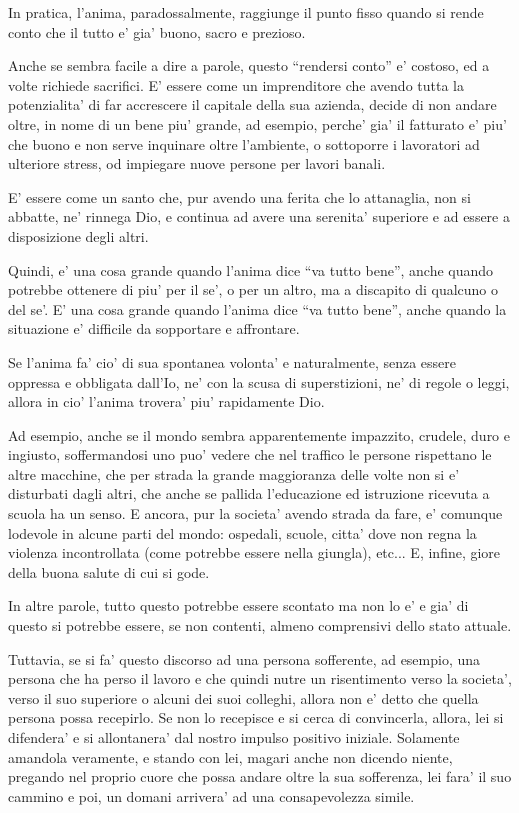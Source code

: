 In pratica, l'anima, paradossalmente, raggiunge il punto fisso quando si rende conto che il tutto e' gia' buono, sacro e prezioso.

Anche se sembra facile a dire a parole, questo ``rendersi conto'' e' costoso, ed a volte richiede sacrifici. E' essere come un imprenditore che avendo tutta la potenzialita' di far accrescere il capitale della sua azienda, decide di non andare oltre, in nome di un bene piu' grande, ad esempio, perche' gia' il fatturato e' piu' che buono e non serve inquinare oltre l'ambiente, o sottoporre i lavoratori ad ulteriore stress, od impiegare nuove persone per lavori banali.

E' essere come un santo che, pur avendo una ferita che lo attanaglia, non si abbatte, ne' rinnega Dio, e continua ad avere una serenita' superiore e ad essere a disposizione degli altri.

Quindi, e' una cosa grande quando l'anima dice ``va tutto bene'', anche quando potrebbe ottenere di piu' per il se', o per un altro, ma a discapito di qualcuno o del se'. E' una cosa grande quando l'anima dice ``va tutto bene'', anche quando la situazione e' difficile da sopportare e affrontare.

Se l'anima fa' cio' di sua spontanea volonta' e naturalmente, senza essere oppressa e obbligata dall'Io, ne' con la scusa di superstizioni, ne' di regole o leggi, allora in cio' l'anima trovera' piu' rapidamente Dio.

Ad esempio, anche se il mondo sembra apparentemente impazzito, crudele, duro e ingiusto, soffermandosi uno puo' vedere che nel traffico le persone rispettano le altre macchine, che per strada la grande maggioranza delle volte non si e' disturbati dagli altri, che anche se pallida l'educazione ed istruzione ricevuta a scuola ha un senso. E ancora, pur la societa' avendo strada da fare, e' comunque lodevole in alcune parti del mondo: ospedali, scuole, citta' dove non regna la violenza incontrollata (come potrebbe essere nella giungla), etc... E, infine, giore della buona salute di cui si gode.

In altre parole, tutto questo potrebbe essere scontato ma non lo e' e gia' di questo si potrebbe essere, se non contenti, almeno comprensivi dello stato attuale.

Tuttavia, se si fa' questo discorso ad una persona sofferente, ad esempio, una persona che ha perso il lavoro e che quindi nutre un risentimento verso la societa', verso il suo superiore o alcuni dei suoi colleghi, allora non e' detto che quella persona possa recepirlo. Se non lo recepisce e si cerca di convincerla, allora, lei si difendera' e si allontanera' dal nostro impulso positivo iniziale. Solamente amandola veramente, e stando con lei, magari anche non dicendo niente, pregando nel proprio cuore che possa andare oltre la sua sofferenza, lei fara' il suo cammino e poi, un domani arrivera' ad una consapevolezza simile.

